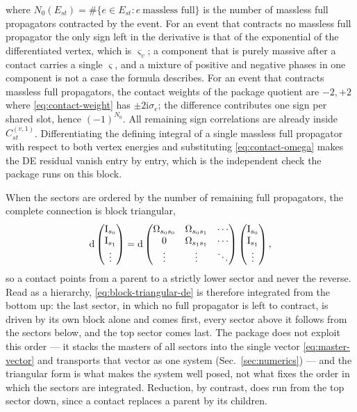 \documentclass[11pt,a4paper]{article}
\newcommand{\nd}{\mathrm{d}}
\newcommand{\ii}{\mathrm i}
\begin{document}
where $N_0(E_{st})=\#\{e\in E_{st}:e\ \text{massless full}\}$ is the number of massless full propagators
contracted by the event.
For an event that contracts no massless full propagator the only sign left in the derivative is that
of the exponential of the differentiated vertex, which is $\varsigma_v$; a component that is purely
massive after a contact carries a single $\varsigma$, and a mixture of positive and negative phases in
one component is not a case the formula describes. For an event that contracts massless full
propagators, the contact weights of the package quotient are $-2,+2$ where \eqref{eq:contact-weight}
has $\pm2\ii\sigma_e$; the difference contributes one sign per shared slot, hence $(-1)^{N_0}$. All
remaining sign correlations are already inside $C^{(v,1)}_{st}$. Differentiating the defining integral
of a single massless full propagator with respect to both vertex energies and substituting
\eqref{eq:contact-omega} makes the DE residual vanish entry by entry, which is the
independent check the package runs on this block.

When the sectors are ordered by the number of remaining full propagators, the complete connection is
block triangular,
\begin{equation}
  \nd
  \begin{pmatrix}\bm{\text I}_{s_0}\\\bm{\text I}_{s_1}\\\vdots\end{pmatrix}
  =\nd
  \begin{pmatrix}\Omega_{s_0s_0}&\Omega_{s_0s_1}&\cdots\\
  0&\Omega_{s_1s_1}&\cdots\\ \vdots&\vdots&\ddots\end{pmatrix}
  \begin{pmatrix}\bm{\text I}_{s_0}\\\bm{\text I}_{s_1}\\\vdots\end{pmatrix},
  \label{eq:block-triangular-de}
\end{equation}
so a contact points from a parent to a strictly lower sector and never the reverse. Read as a
hierarchy, \eqref{eq:block-triangular-de} is therefore integrated from the bottom up: the last sector,
in which no full propagator is left to contract, is driven by its own block alone and comes first,
every sector above it follows from the sectors below, and the top sector comes last. The package does
not exploit this order --- it stacks the masters of all sectors into the single vector
\eqref{eq:master-vector} and transports that vector as one system (Sec.~\ref{sec:numerics}) --- and the
triangular form is what makes the system well posed, not what fixes the order in which the sectors are
integrated. Reduction, by
contrast, does run from the top sector down, since a contact replaces a parent by its children.
\end{document}
